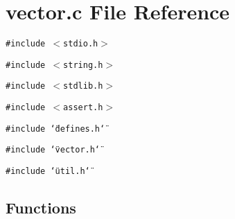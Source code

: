 \section{vector.c File Reference}
\label{vector_8c}
{\tt \#include $<$stdio.h$>$}\par
{\tt \#include $<$string.h$>$}\par
{\tt \#include $<$stdlib.h$>$}\par
{\tt \#include $<$assert.h$>$}\par
{\tt \#include \char`\"{}defines.h\char`\"{}}\par
{\tt \#include \char`\"{}vector.h\char`\"{}}\par
{\tt \#include \char`\"{}util.h\char`\"{}}\par
\subsection*{Functions}
